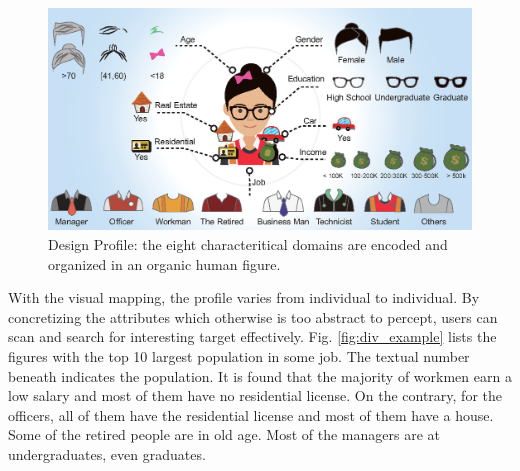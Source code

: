 \documentclass{ieeeaccess}
\begin{document}
\begin{figure}[htb!]
 \centering %
 \includegraphics[width=\columnwidth]{pictures/design_profile}
 \caption{Design Profile: the eight characteritical domains are encoded and organized in an organic human figure.}
 \label{fig:design_profile}
\end{figure}

With the visual mapping, the profile varies from individual to individual. By concretizing the attributes which otherwise is too abstract to percept, users can scan and search for interesting target effectively. Fig. \ref{fig:div_example} lists the figures with the top 10 largest population in some job. The textual number beneath indicates the population. It is found that the majority of workmen earn a low salary and most of them have no residential license. On the contrary, for the officers, all of them have the residential license and most of them have a house. Some of the retired people are in old age. Most of the managers are at undergraduates, even graduates.
\end{document}
